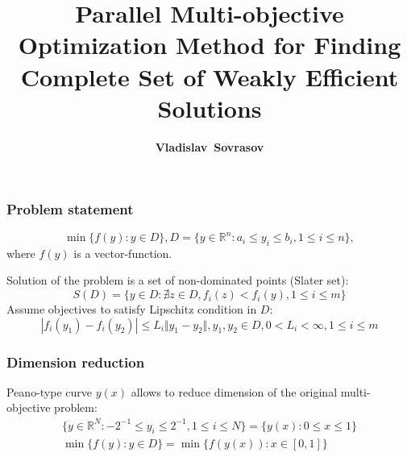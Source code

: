 \documentclass[aspectratio=1610]{beamer}
\title{Parallel Multi-objective Optimization Method for Finding Complete Set of Weakly Efficient Solutions}
\author{\textbf{Vladislav~Sovrasov}}
\institute{Lobachevsky University}
\date{}
\begin{document}
\begin{frame}
\titlepage
\end{frame}

\begin{frame}
  \begin{center}
  \frametitle{Problem statement}

  \begin{displaymath}
    \min\{f(y): y\in D\}, D=\{y\in \mathbb{R}^n: a_i \leqslant y_i \leqslant b_i, 1\leqslant i \leqslant n \},
  \end{displaymath}
where \(f(y)\) is a vector-function.

\enspace
Solution of the problem is a set of non-dominated points (Slater set):
  \begin{displaymath}
    S(D) = \{y\in D: \nexists z\in D, f_i(z)<f_i(y),1\leqslant i \leqslant m\}
  \end{displaymath}
Assume objectives to satisfy Lipschitz condition in \(D\):
  \begin{displaymath}
    |f_i(y_1)-f_i(y_2)|\leqslant L_i\Vert y_1-y_2\Vert,y_1,y_2\in D,0<L_i<\infty,1\leqslant i\leqslant m
  \end{displaymath}

\end{center}
\end{frame}

\begin{frame}
  \frametitle{Dimension reduction}
  Peano-type curve \(y(x)\) allows to reduce dimension of the original multi-objective problem:
  \begin{gather}
    \lbrace y\in \mathbb{R}^N:-2^{-1}\leqslant y_i\leqslant 2^{-1},1\leqslant i\leqslant N\rbrace=\{y(x):0\leqslant x\leqslant 1\} \nonumber \\
    \min\{f(y): y\in D\}=\min\{f(y(x)): x\in [0,1]\} \nonumber
  \end{gather}

  \begin{figure}[ht]
  \end{figure}
\end{frame}
\end{document}
